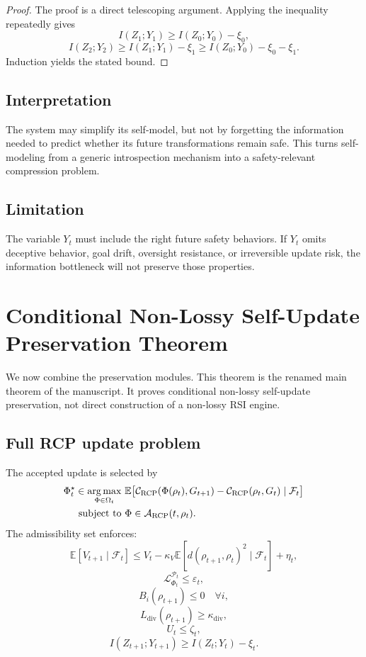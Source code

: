 \documentclass[11pt]{article}
\newcommand{\Acal}{\mathcal{A}}
\newcommand{\Pcal}{\mathcal{P}}
\newcommand{\Fcal}{\mathcal{F}}
\newcommand{\Ccal}{\mathcal{C}}
\newcommand{\Lcal}{\mathcal{L}}
\newcommand{\argmax}{\operatorname*{arg\,max}}
\newcommand{\1}{\mathbf{1}}
\newcommand{\eps}{\varepsilon}
\newcommand{\RCP}{\mathrm{RCP}}
\newcommand{\diver}{\mathrm{div}}
\begin{document}
\begin{proof}
The proof is a direct telescoping argument. Applying the inequality repeatedly gives
\[
I(Z_1;Y_1)
\ge
I(Z_0;Y_0)-\xi_0,
\]
\[
I(Z_2;Y_2)
\ge
I(Z_1;Y_1)-\xi_1
\ge
I(Z_0;Y_0)-\xi_0-\xi_1.
\]
Induction yields the stated bound.
\end{proof}

\subsection{Interpretation}

The system may simplify its self-model, but not by forgetting the information needed to predict whether its future transformations remain safe. This turns self-modeling from a generic introspection mechanism into a safety-relevant compression problem.

\subsection{Limitation}

The variable \(Y_t\) must include the right future safety behaviors. If \(Y_t\) omits deceptive behavior, goal drift, oversight resistance, or irreversible update risk, the information bottleneck will not preserve those properties.

\section{Conditional Non-Lossy Self-Update Preservation Theorem}

We now combine the preservation modules.  This theorem is the renamed main theorem of the manuscript.  It proves conditional non-lossy self-update preservation, not direct construction of a non-lossy RSI engine.

\subsection{Full RCP update problem}

The accepted update is selected by
\begin{align}
\Phi_t^\star
\in
\argmax_{\Phi\in\Omega_t}
&\ \mathbb E\bigl[
\Ccal_{\RCP}(\Phi(\rho_t),G_{t+1})
-
\Ccal_{\RCP}(\rho_t,G_t)
\mid\Fcal_t
\bigr]
\label{eq:full_rcp_opt}\\
\text{subject to}
&\ \Phi\in\Acal_{\RCP}(t,\rho_t).
\notag
\end{align}
The admissibility set enforces:
\[
\mathbb E[V_{t+1}\mid\Fcal_t]
\le
V_t-
\kappa_V\mathbb E[d(\rho_{t+1},\rho_t)^2\mid\Fcal_t]
+
\eta_t,
\]
\[
\Lcal^{\Pcal_t}_{\Phi_t}\le\eps_t,
\]
\[
B_i(\rho_{t+1})\le0\quad\forall i,
\]
\[
L_{\diver}(\rho_{t+1})\ge\kappa_{\diver},
\]
\[
U_t\le\zeta_t,
\]
\[
I(Z_{t+1};Y_{t+1})
\ge
I(Z_t;Y_t)-\xi_t.
\]
\end{document}
